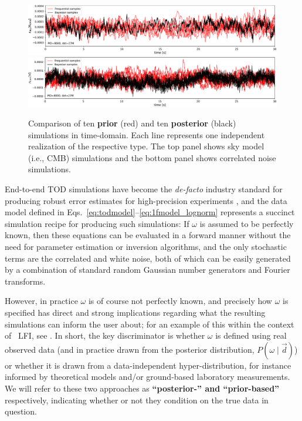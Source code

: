 \documentclass[twocolumn]{aa}%
\renewcommand{\d}[0]{\vec{d}}
\begin{document}
\begin{figure}[t]
  \begin{center}
    \includegraphics[width=\linewidth]{figs/bayes_vs_freq_ssky_PID8000_det27M.pdf}\\
    \includegraphics[width=\linewidth]{figs/bayes_vs_freq_ncorr_PID8000_det27M.pdf}
    \caption{Comparison of ten {\bf prior} (red) and ten {\bf posterior}
      (black) simulations in time-domain. Each line represents one
      independent realization of the respective type. The top panel
      shows sky model (i.e., CMB) simulations and the bottom panel
      shows correlated noise simulations.}
    \label{fig:freq_vs_bayes}
  \end{center}
\end{figure}

End-to-end TOD simulations have become the \textit{de-facto} industry standard
for producing robust error estimates for high-precision experiments
\citep[e.g.,][]{planck2014-a14}, and the data model defined in
Eqs.~\eqref{eq:todmodel}--\eqref{eq:1fmodel_lognorm} represents a
succinct simulation recipe for producing such simulations: If $\omega$
is assumed to be perfectly known, then these equations can be
evaluated in a forward manner without the need for parameter
estimation or inversion algorithms, and the only stochastic terms are
the correlated and white noise, both of which can be easily generated
by a combination of standard random Gaussian number generators and
Fourier transforms. 

However, in practice $\omega$ is of course not perfectly known, and
precisely how $\omega$ is specified has direct and strong implications
regarding what the resulting simulations can inform the user about;
for an example of this within the context of \Planck\ LFI, see
\citet{bp10}. In short, the key discriminator is whether $\omega$ is
defined using real observed data (and in practice drawn from the
posterior distribution, $P(\omega\mid\d)$) or whether it is drawn from a
data-independent hyper-distribution, for instance informed by
theoretical models and/or ground-based laboratory measurements. 
We will refer to these two approaches as {\bf ``posterior-'' and ``prior-based''}
respectively, indicating whether or not they condition on the true
data in question.
\end{document}
